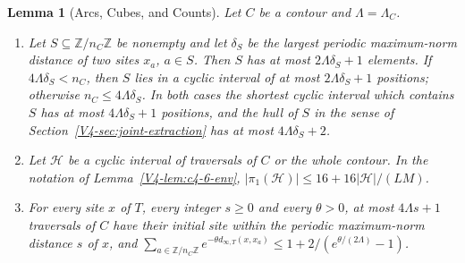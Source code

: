 \documentclass[11pt]{article}
\numberwithin{equation}{section}
\newtheorem{lemma}[theorem]{Lemma}
\theoremstyle{remark}
\theoremstyle{plain}
\begin{document}
\begin{lemma}[Arcs, Cubes, and Counts]\label{lem:torus-counts}
Let $C$ be a contour and $\Lambda=\Lambda_C$.
\begin{enumerate}[label=(\alph*)]
    \item Let $S\subseteq\mathbb Z/n_C\mathbb Z$ be nonempty and let $\delta_S$ be the largest periodic maximum-norm distance of two sites $x_a$, $a\in S$. Then $S$ has at most $2\Lambda\delta_S+1$ elements. If $4\Lambda\delta_S< n_C$, then $S$ lies in a cyclic interval of at most $2\Lambda\delta_S+1$ positions; otherwise $n_C\leqslant 4\Lambda\delta_S$. In both cases the shortest cyclic interval which contains $S$ has at most $4\Lambda\delta_S+1$ positions, and the hull of $S$ in the sense of Section~\ref{V4-sec:joint-extraction} has at most $4\Lambda\delta_S+2$.
    \item Let $\mathcal H$ be a cyclic interval of traversals of $C$ or the whole contour. In the notation of Lemma~\ref{V4-lem:c4-6-env}, $|\pi_1(\mathcal H)|\leqslant 16+16|\mathcal H|/(LM)$.
    \item For every site $x$ of $T$, every integer $s\geqslant 0$ and every $\theta>0$, at most $4\Lambda s+1$ traversals of $C$ have their initial site within the periodic maximum-norm distance $s$ of $x$, and $\sum_{a\in\mathbb Z/n_C\mathbb Z}e^{-\theta d_{\infty,T}(x,x_a)}\leqslant 1+2/(e^{\theta/(2\Lambda)}-1)$.
\end{enumerate}
\end{lemma}
\end{document}
